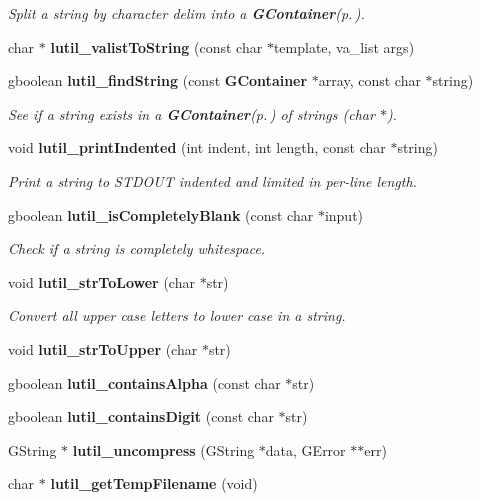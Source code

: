 \begin{CompactItemize}
\begin{CompactList}\small\item\em Split a string by character delim into a {\bf GContainer}{\rm (p.\,\pageref{structGContainer})}. \item\end{CompactList}\item 
char $\ast$ {\bf lutil\_\-valist\-To\-String} (const char $\ast$template, va\_\-list args)
\item 
gboolean {\bf lutil\_\-find\-String} (const {\bf GContainer} $\ast$array, const char $\ast$string)
\begin{CompactList}\small\item\em See if a string exists in a {\bf GContainer}{\rm (p.\,\pageref{structGContainer})} of strings (char $\ast$). \item\end{CompactList}\item 
void {\bf lutil\_\-print\-Indented} (int indent, int length, const char $\ast$string)
\begin{CompactList}\small\item\em Print a string to STDOUT indented and limited in per-line length. \item\end{CompactList}\item 
gboolean {\bf lutil\_\-is\-Completely\-Blank} (const char $\ast$input)
\begin{CompactList}\small\item\em Check if a string is completely whitespace. \item\end{CompactList}\item 
void {\bf lutil\_\-str\-To\-Lower} (char $\ast$str)
\begin{CompactList}\small\item\em Convert all upper case letters to lower case in a string. \item\end{CompactList}\item 
void {\bf lutil\_\-str\-To\-Upper} (char $\ast$str)
\item 
gboolean {\bf lutil\_\-contains\-Alpha} (const char $\ast$str)
\item 
gboolean {\bf lutil\_\-contains\-Digit} (const char $\ast$str)
\item 
GString $\ast$ {\bf lutil\_\-uncompress} (GString $\ast$data, GError $\ast$$\ast$err)
\item 
char $\ast$ {\bf lutil\_\-get\-Temp\-Filename} (void)
$$
\end{CompactItemize}
